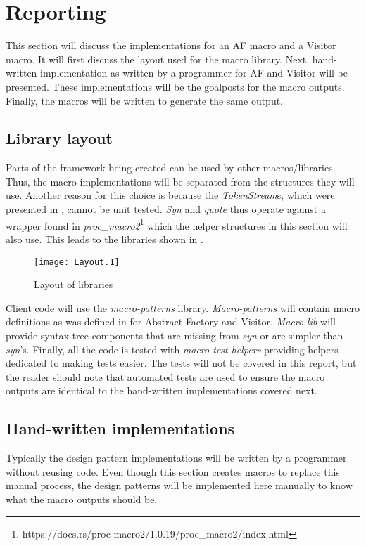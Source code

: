 \section{Reporting}
This section will discuss the implementations for an AF macro and a Visitor macro.
It will first discuss the layout used for the macro library.
Next, hand-written implementation as written by a programmer for AF and Visitor will be presented.
These implementations will be the goalposts for the macro outputs.
Finally, the macros will be written to generate the same output.

\subsection{Library layout}
Parts of the framework being created can be used by other macros/libraries.
Thus, the macro implementations will be separated from the structures they will use.
Another reason for this choice is because the \textit{TokenStream}s, which were presented in , cannot be unit tested.
\textit{Syn} and \textit{quote} thus operate against a wrapper found in \textit{proc\_macro2}\footnote{https://docs.rs/proc-macro2/1.0.19/proc\_macro2/index.html} which the helper structures in this section will also use.
This leads to the libraries shown in .

\begin{figure}[h]
	\centering
	\texttt{[image: Layout.1]}
	\caption{Layout of libraries}
	\label{fig:LibraryLayout}
\end{figure}

Client code will use the \textit{macro-patterns} library.
\textit{Macro-patterns} will contain macro definitions as was defined in  for Abstract Factory and Visitor.
\textit{Macro-lib} will provide syntax tree components that are missing from \textit{syn} or are simpler than \textit{syn}'s.
Finally, all the code is tested with \textit{macro-test-helpers} providing helpers dedicated to making tests easier.
The tests will not be covered in this report, but the reader should note that automated tests are used to ensure the macro outputs are identical to the hand-written implementations covered next.

\subsection{Hand-written implementations}
\label{sec:hand-written}
Typically the design pattern implementations will be written by a programmer without reusing code.
Even though this section creates macros to replace this manual process, the design patterns will be implemented here manually to know what the macro outputs should be.

